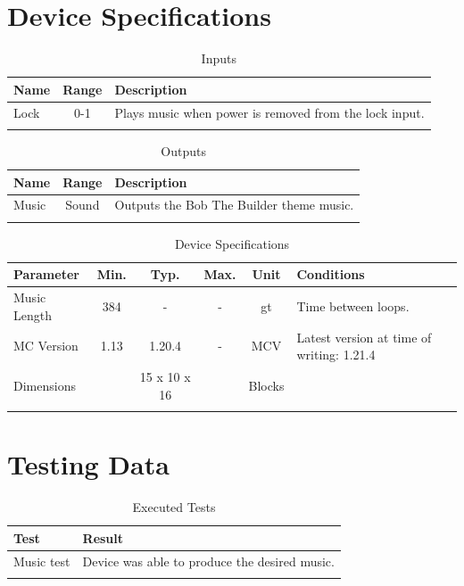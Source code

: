 \documentclass[10pt]{datasheet}
\begin{document}
\section{Device Specifications}

\begin{table}[H]
    \caption{Inputs}
    \begin{tabularx}{\textwidth}{l | c | X}
        \thickhline
        \textbf{Name} & \textbf{Range} & \textbf{Description} \\
        \hline
        Lock & 0-1 & Plays music when power is removed from the lock input. \\
        \thickhline
\end{tabularx}
\end{table}

\begin{table}[H]
    \caption{Outputs}
    \begin{tabularx}{\textwidth}{l | c | X}
        \thickhline
        \textbf{Name} & \textbf{Range} & \textbf{Description} \\
        \hline
        Music & Sound & Outputs the Bob The Builder theme music. \\
        \thickhline
\end{tabularx}
\end{table}

\begin{table}[H]
    \caption{Device Specifications}
    \begin{tabularx}{\textwidth}{l | c c c | c | X}
        \thickhline
        \textbf{Parameter} & \textbf{Min.} & \textbf{Typ.} & \textbf{Max.} &
        \textbf{Unit} & \textbf{Conditions} \\
        \hline
        Music Length & 384 & - & - & gt & Time between loops. \\
        \hline
        MC Version & 1.13 & 1.20.4 & - & MCV & Latest version at time of writing: 1.21.4\\
        \hline
        Dimensions & & 15 x 10 x 16 & & Blocks & \\
        \thickhline
\end{tabularx}
\end{table}

\section{Testing Data}
\begin{table}[H]
\caption{Executed Tests}
\begin{tabularx}{\textwidth}{l | X}
    \thickhline
    \textbf{Test} & \textbf{Result} \\
    \hline
    Music test & Device was able to produce the desired music. \\
    \thickhline
\end{tabularx}
\end{table}
\end{document}
